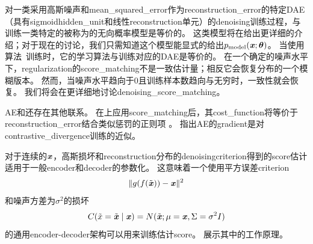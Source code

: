 对一类采用高斯噪声和\gls{mean_squared_error}作为\gls{reconstruction_error}的特定\gls{DAE}（具有sigmoid\gls{hidden_unit}和线性\gls{reconstruction}单元）的\gls{denoising}训练过程，与训练一类特定的被称为的无向概率模型是等价的\citep{Vincent-NC-2011-small}。
这类模型将在给出更详细的介绍；对于现在的讨论，我们只需知道这个模型能显式的给出$p_{\text{model}}(\boldsymbol{\mathit{x}}; \boldsymbol{\theta})$。
当使用算法~\citep{Kingma+LeCun-2010-small}训练时，它的学习算法与训练对应的\gls{DAE}是等价的。
在一个确定的噪声水平下，\gls{regularization}的\gls{score_matching}不是一致估计量；相反它会恢复分布的一个模糊版本。
然而，当噪声水平趋向于0且训练样本数趋向与无穷时，一致性就会恢复。
我们将会在更详细地讨论\gls{denoising_score_matching}。


\gls{AE}和还存在其他联系。
在上应用\gls{score_matching}后，其\gls{cost_function}将等价于\gls{reconstruction_error}结合类似惩罚的正则项 \citep{Swersky-ICML2011}。
\citet{Bengio+Delalleau-2009}指出\gls{AE}的\gls{gradient}是对\gls{contrastive_divergence}训练的近似。


对于连续的$\boldsymbol{\mathit{x}}$，高斯损坏和\gls{reconstruction}分布的\gls{denoising}\gls{criterion}得到的\gls{score}估计适用于一般\gls{encoder}和\gls{decoder}的参数化\citep{Alain+Bengio-ICLR2013-small}。
这意味着一个使用平方误差\gls{criterion}
\begin{align}
 \| g(f(\tilde {\boldsymbol{\mathit{x}}})) - \boldsymbol{\mathit{x}} \|^2
\end{align}
和噪声方差为$\sigma^2 $的损坏
\begin{align}
 C(\tilde x = \tilde {\boldsymbol{\mathit{x}}} \mid \boldsymbol{\mathit{x}}) = N(\tilde {\boldsymbol{\mathit{x}}}; \mu=\boldsymbol{\mathit{x}}, \Sigma = \sigma^2 I)
\end{align}
的通用\gls{encoder}-\gls{decoder}架构可以用来训练估计\gls{score}。
展示其中的工作原理。

